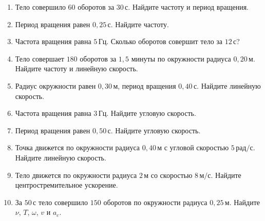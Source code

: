 \documentclass[a4paper,12pt]{article}
\newcommand{\Hz}{\,\text{Гц}}
\newcommand{\secnd}{\,\text{с}}
\newcommand{\metr}{\,\text{м}}
\newcommand{\ms}{\,\text{м/с}}
\newcommand{\rads}{\,\text{рад/с}}
\begin{document}
\begin{enumerate}[label=\textbf{\arabic*.}]
  \item Тело совершило $60$ оборотов за $30\secnd$. Найдите частоту и период вращения.

  \item Период вращения равен $0{,}25\secnd$. Найдите частоту.

  \item Частота вращения равна $5\Hz$. Сколько оборотов совершит тело за $12\secnd$?

  \item Тело совершает $180$ оборотов за $1{,}5$ минуты по окружности радиуса $0{,}20\metr$. Найдите частоту и линейную скорость.

  \item Радиус окружности равен $0{,}30\metr$, период вращения $0{,}40\secnd$. Найдите линейную скорость.

  \item Частота вращения равна $3\Hz$. Найдите угловую скорость.

  \item Период вращения равен $0{,}50\secnd$. Найдите угловую скорость.

  \item Точка движется по окружности радиуса $0{,}40\metr$ с угловой скоростью $5\rads$. Найдите линейную скорость.

  \item Тело движется по окружности радиуса $2\metr$ со скоростью $8\ms$. Найдите центростремительное ускорение.

  \item За $50\secnd$ тело совершило $150$ оборотов по окружности радиуса $0{,}25\metr$. Найдите $\nu$, $T$, $\omega$, $v$ и $a_c$.
\end{enumerate}

\clearpage
\end{document}
